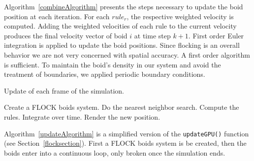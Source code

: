 Algorithm~\ref{combineAlgorithm} presents the steps necessary to update the boid position at each iteration. For each $rule_r$, the respective weighted velocity is computed. Adding the weighted velocities of each rule to the current velocity produces the final velocity vector of boid $i$ at time step $k+1$. First order Euler integration is applied to update the boid positions. Since flocking is an overall behavior we are not very concerned with spatial accuracy. A first order algorithm is sufficient. To maintain the boid's density in our system and avoid the treatment of boundaries, we applied periodic boundary conditions. 
 
\vspace{32pt}
\begin{algorithm}
\caption{Update of each frame of the simulation.}
\label{updateAlgorithm}
\begin{algorithmic}
\STATE Create a FLOCK boids system.
\STATE Do the nearest neighbor search.
\STATE Compute the rules.
\STATE Integrate over time.
\STATE Render the new position.
\ENDFOR
\end{algorithmic}
\end{algorithm}
\vspace{32pt}

Algorithm~\ref{updateAlgorithm} is a simplified version of the \texttt{updateGPU()} function (see Section~\ref{flocksection}). First a FLOCK boids system is be created, then the boids enter into a continuous loop, only broken once the simulation ends. 
